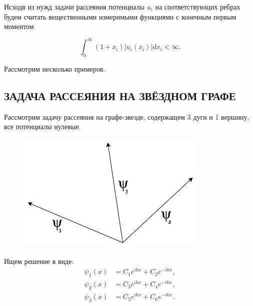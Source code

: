 \documentclass[a4 paper, 12 pt]{extarticle}
\begin{document}
  Исходя из нужд задачи рассеяния потенциалы $u_i$ на
  соответствующих ребрах будем считать вещественными измеримыми
  функциями с конечным первым моментом
  
  \begin{equation}
  \int_0^\infty(1+x_i)|u_i(x_i)|dx_i<\infty.
  \end{equation}
  
  Рассмотрим несколько примеров.
  
  \subsection{ЗАДАЧА РАССЕЯНИЯ НА ЗВЁЗДНОМ ГРАФЕ}
  Рассмотрим задачу рассеяния на графе-звезде, содержащем 3 дуги и 1 вершину, все потенциалы нулевые.
  \begin{figure}[!htb]
  	\centering
  	\includegraphics[scale=0.5]{star.jpg}
  \end{figure}
  Ищем решение в виде:
  \[\begin{split}
  \psi_1\left(x\right) &= C_1 e^{ikx} + C_2 e^{-ikx}, \\
  \psi_2\left(x\right) &= C_3 e^{ikx} + C_4 e^{-ikx}, \\
  \psi_3\left(x\right) &= C_5 e^{ikx} + C_6 e^{-ikx}.
  \end{split}\]
  
\end{document}
